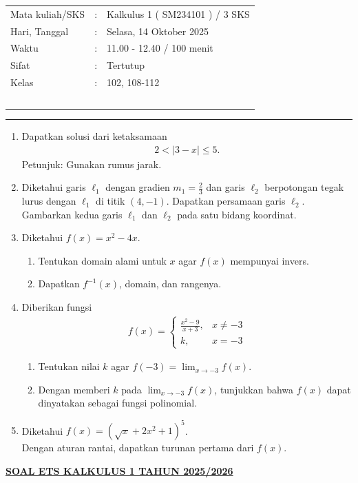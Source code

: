 \documentclass[10pt,openany,a4paper]{article}
\theoremstyle{definition}
\theoremstyle{definition}
\theoremstyle{plain}
\begin{document}
    \begin{center}
	\begin{tabular}{lcl}
		Mata kuliah/SKS & : & Kalkulus 1 ( SM234101 ) / 3 SKS\\
		Hari, Tanggal & : & Selasa, 14 Oktober 2025\\
		Waktu & : & 11.00 - 12.40 / 100 menit\\
		Sifat & : & Tertutup\\
		Kelas & : & 102, 108-112\\
  ~
	\end{tabular}
    
    \noindent\rule{\textwidth}{2.pt}
        \end{center}
        \begin{enumerate}
            \item Dapatkan solusi dari ketaksamaan 
            \begin{align*}
                2<|3-x|\leq 5.
            \end{align*}
            Petunjuk: Gunakan rumus jarak.
            \item Diketahui garis $\ell_1$ dengan gradien $m_1=\frac{2}{3}$ dan garis $\ell_2$ berpotongan tegak lurus dengan $\ell_1$ di titik $(4,-1)$. Dapatkan persamaan garis $\ell_2$. \\
            Gambarkan kedua garis $\ell_1$ dan $\ell_2$ pada satu bidang koordinat. 
            \item Diketahui $f(x)=x^2-4x$.
            \begin{enumerate}
                \item Tentukan domain alami untuk $x$ agar $f(x)$ mempunyai invers.
                \item Dapatkan $f^{-1}(x)$, domain, dan rangenya. 
            \end{enumerate}
            \item Diberikan fungsi 
            \begin{align*}
                f(x)=\begin{cases}
                    \frac{x^2-9}{x+3}, &x\neq -3\\
                    k, &x=-3
                \end{cases}
            \end{align*}
            \begin{enumerate}
                \item Tentukan nilai $k$ agar $f(-3)=\displaystyle\lim_{x\to -3} f(x)$.
                \item Dengan memberi $k$ pada $\displaystyle\lim_{x\to-3} f(x)$, tunjukkan bahwa $f(x)$ dapat dinyatakan sebagai fungsi polinomial. 
            \end{enumerate}
            \item Diketahui $f(x)=(\sqrt{x}+2x^2+1)^5$.\\
            Dengan aturan rantai, dapatkan turunan pertama dari $f(x)$.
        \end{enumerate}
               \newpage
 \begin{center}
	{\underline{\textbf{\MakeUppercase{Soal ETS Kalkulus 1 Tahun 2025/2026}}}}
    \end{center}
\end{document}
